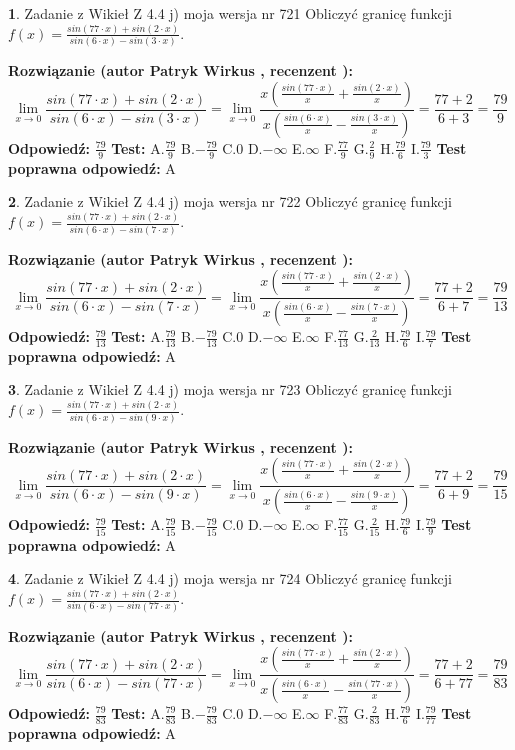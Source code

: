 \documentclass[12pt, a4paper]{article}
\theoremstyle{definition} %
\newtheorem{zad}{}
\newcommand{\zadStart}[1]{\begin{zad}#1\newline}
\newcommand{\zadStop}{\end{zad}}
\newcommand{\rozwStart}[2]{\noindent \textbf{Rozwiązanie (autor #1 , recenzent #2): }\newline}
\newcommand{\rozwStop}{\newline}
\newcommand{\odpStart}{\noindent \textbf{Odpowiedź:}\newline}
\newcommand{\odpStop}{\newline}
\newcommand{\testStart}{\noindent \textbf{Test:}\newline}
\newcommand{\testStop}{\newline}
\newcommand{\kluczStart}{\noindent \textbf{Test poprawna odpowiedź:}\newline}
\newcommand{\kluczStop}{\newline}
\begin{document}
\zadStart{Zadanie z Wikieł Z 4.4 j) moja wersja nr 721}
Obliczyć granicę funkcji $f(x)=\frac{sin(77\cdot x) +sin(2\cdot x)}{sin(6\cdot x) -sin(3\cdot x)}$.
\zadStop
\rozwStart{Patryk Wirkus}{}
$$\lim\limits_{x\to 0}\frac{sin(77\cdot x) +sin(2\cdot x)}{sin(6\cdot x) -sin(3\cdot x)}=\lim\limits_{x\to 0}\frac{x(\frac{sin(77\cdot x)}{x}+\frac{sin(2\cdot x)}{x})}{x(\frac{sin(6\cdot x)}{x}-\frac{sin(3\cdot x)}{x})}=\frac{77+2}{6+3} = \frac{79}{9}$$
\rozwStop
\odpStart
$\frac{79}{9}$
\odpStop
\testStart
A.$\frac{79}{9}$
B.$-\frac{79}{9}$
C.$0$
D.$-\infty$
E.$\infty$
F.$\frac{77}{9}$
G.$\frac{2}{9}$
H.$\frac{79}{6}$
I.$\frac{79}{3}$
\testStop
\kluczStart
A
\kluczStop



\zadStart{Zadanie z Wikieł Z 4.4 j) moja wersja nr 722}
Obliczyć granicę funkcji $f(x)=\frac{sin(77\cdot x) +sin(2\cdot x)}{sin(6\cdot x) -sin(7\cdot x)}$.
\zadStop
\rozwStart{Patryk Wirkus}{}
$$\lim\limits_{x\to 0}\frac{sin(77\cdot x) +sin(2\cdot x)}{sin(6\cdot x) -sin(7\cdot x)}=\lim\limits_{x\to 0}\frac{x(\frac{sin(77\cdot x)}{x}+\frac{sin(2\cdot x)}{x})}{x(\frac{sin(6\cdot x)}{x}-\frac{sin(7\cdot x)}{x})}=\frac{77+2}{6+7} = \frac{79}{13}$$
\rozwStop
\odpStart
$\frac{79}{13}$
\odpStop
\testStart
A.$\frac{79}{13}$
B.$-\frac{79}{13}$
C.$0$
D.$-\infty$
E.$\infty$
F.$\frac{77}{13}$
G.$\frac{2}{13}$
H.$\frac{79}{6}$
I.$\frac{79}{7}$
\testStop
\kluczStart
A
\kluczStop



\zadStart{Zadanie z Wikieł Z 4.4 j) moja wersja nr 723}
Obliczyć granicę funkcji $f(x)=\frac{sin(77\cdot x) +sin(2\cdot x)}{sin(6\cdot x) -sin(9\cdot x)}$.
\zadStop
\rozwStart{Patryk Wirkus}{}
$$\lim\limits_{x\to 0}\frac{sin(77\cdot x) +sin(2\cdot x)}{sin(6\cdot x) -sin(9\cdot x)}=\lim\limits_{x\to 0}\frac{x(\frac{sin(77\cdot x)}{x}+\frac{sin(2\cdot x)}{x})}{x(\frac{sin(6\cdot x)}{x}-\frac{sin(9\cdot x)}{x})}=\frac{77+2}{6+9} = \frac{79}{15}$$
\rozwStop
\odpStart
$\frac{79}{15}$
\odpStop
\testStart
A.$\frac{79}{15}$
B.$-\frac{79}{15}$
C.$0$
D.$-\infty$
E.$\infty$
F.$\frac{77}{15}$
G.$\frac{2}{15}$
H.$\frac{79}{6}$
I.$\frac{79}{9}$
\testStop
\kluczStart
A
\kluczStop



\zadStart{Zadanie z Wikieł Z 4.4 j) moja wersja nr 724}
Obliczyć granicę funkcji $f(x)=\frac{sin(77\cdot x) +sin(2\cdot x)}{sin(6\cdot x) -sin(77\cdot x)}$.
\zadStop
\rozwStart{Patryk Wirkus}{}
$$\lim\limits_{x\to 0}\frac{sin(77\cdot x) +sin(2\cdot x)}{sin(6\cdot x) -sin(77\cdot x)}=\lim\limits_{x\to 0}\frac{x(\frac{sin(77\cdot x)}{x}+\frac{sin(2\cdot x)}{x})}{x(\frac{sin(6\cdot x)}{x}-\frac{sin(77\cdot x)}{x})}=\frac{77+2}{6+77} = \frac{79}{83}$$
\rozwStop
\odpStart
$\frac{79}{83}$
\odpStop
\testStart
A.$\frac{79}{83}$
B.$-\frac{79}{83}$
C.$0$
D.$-\infty$
E.$\infty$
F.$\frac{77}{83}$
G.$\frac{2}{83}$
H.$\frac{79}{6}$
I.$\frac{79}{77}$
\testStop
\kluczStart
A
\kluczStop
\end{document}

